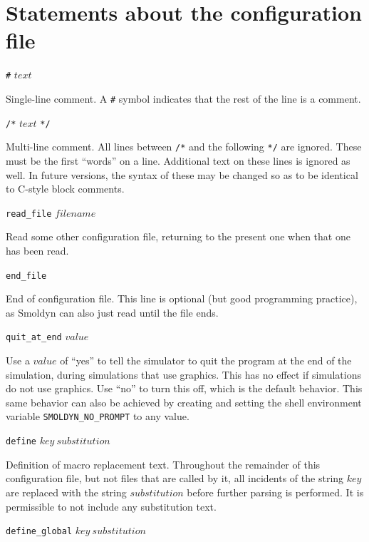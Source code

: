 \documentclass {book}
\newcommand {\ttt} {\texttt}
\begin{document}
\section{Statements about the configuration file}

\begin{description}

\item{\ttt{\#} $text$}

Single-line comment. A \ttt{\#} symbol indicates that the rest of the line is a comment.

\item{\ttt{/*} $text$ \ttt{*/}}

Multi-line comment. All lines between \ttt{/*} and the following \ttt{*/} are ignored. These must be the first ``words'' on a line. Additional text on these lines is ignored as well. In future versions, the syntax of these may be changed so as to be identical to C-style block comments.

\item{\ttt{read\_file} $filename$}

Read some other configuration file, returning to the present one when that one has been read.

\item{\ttt{end\_file}}

End of configuration file. This line is optional (but good programming practice), as Smoldyn can also just read until the file ends.

\item{\ttt{quit\_at\_end} $value$}

Use a $value$ of ``yes'' to tell the simulator to quit the program at the end of the simulation, during simulations that use graphics. This has no effect if simulations do not use graphics. Use ``no'' to turn this off, which is the default behavior. This same behavior can also be achieved by creating and setting the shell environment variable \ttt{SMOLDYN\_NO\_PROMPT} to any value.

\item{\ttt{define} $key\ substitution$}

Definition of macro replacement text. Throughout the remainder of this configuration file, but not files that are called by it, all incidents of the string $key$ are replaced with the string $substitution$ before further parsing is performed. It is permissible to not include any substitution text.

\item{\ttt{define\_global} $key\ substitution$}


\end{description}
\end{document}
